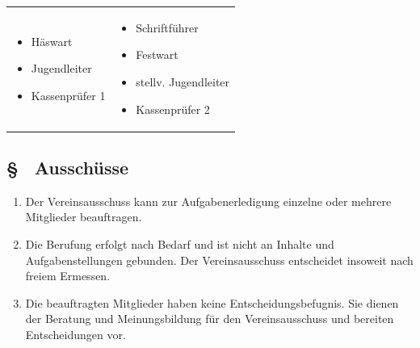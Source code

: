 \begin{enumerate}
\begin{tabular}{p{5cm}p{5cm}}
    \begin{itemize}
        \item Häswart
        \item Jugendleiter
        \item Kassenprüfer 1
    \end{itemize} &
    \begin{itemize}
        \item Schriftführer
        \item Festwart
        \item stellv. Jugendleiter
        \item Kassenprüfer 2
    \end{itemize} \\
    \end{tabular}
\end{enumerate}

\subsection{§ \thegoparagraphcounter\ Ausschüsse} \label{go:par:ausschuesse}
\begin{enumerate}
    \item \label{go:abs:pdl45j} Der Vereinsausschuss kann zur Aufgabenerledigung einzelne oder mehrere Mitglieder beauftragen.

    \item \label{go:abs:fs67un} Die Berufung erfolgt nach Bedarf und ist nicht an Inhalte und Aufgabenstellungen gebunden. Der Vereinsausschuss entscheidet insoweit nach freiem Ermessen.

    \item \label{go:abs:7m0wd4} Die beauftragten Mitglieder haben keine Entscheidungsbefugnis. Sie dienen der Beratung und Meinungsbildung für den Vereinsausschuss und bereiten Entscheidungen vor.
\end{enumerate}

